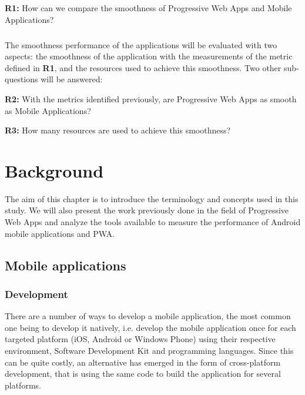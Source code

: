 \documentclass{kththesis}
\begin{document}
\textbf{R1:} How can we compare the smoothness of Progressive Web Apps and Mobile Applications?

\paragraph{}
The smoothness performance of the applications will be evaluated with two aspects: the smoothness of the application with the measurements of the metric defined in \textbf{R1}, and the resources used to achieve this smoothness. Two other sub-questions will be answered: \newline

\textbf{R2:} With the metrics identified previously, are Progressive Web Apps as smooth as Mobile Applications? \newline

\medskip

\textbf{R3:} How many resources are used to achieve this smoothness?
\fi



\chapter{Background}


The aim of this chapter is to introduce the terminology and concepts used in this study. We will also present the work previously done in the field of Progressive Web Apps and analyze the tools available to measure the performance of Android mobile applications and PWA.

\section{Mobile applications}
\subsection{Development}
There are a number of ways to develop a mobile application, the most common one being to develop it natively, i.e. develop the mobile application once for each targeted platform (iOS, Android or Windows Phone) using their respective environment, Software Development Kit and programming languages. Since this can be quite costly, an alternative has emerged in the form of cross-platform development, that is using the same code to build the application for several platforms.
\end{document}
